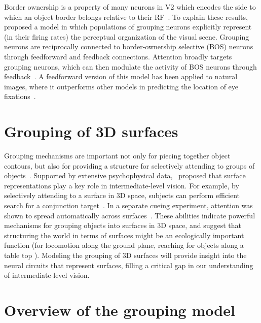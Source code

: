 Border ownership is a property of many neurons in V2 which encodes the side to which an object border belongs relative to their RF~\citep{Zhou_etal00}. To explain these results,~\citet{Craft_etal07} proposed a model in which populations of grouping neurons explicitly represent (in their firing rates) the perceptual organization of the visual scene. Grouping neurons are reciprocally connected to border-ownership selective (BOS) neurons through feedforward and feedback connections. Attention broadly targets grouping neurons, which can then modulate the activity of BOS neurons through feedback~\citep{Mihalas_etal11b}. A feedforward version of this model has been applied to natural images, where it outperforms other models in predicting the location of eye fixations~\citep{Russell_etal14}.

\section{Grouping of 3D surfaces}

Grouping mechanisms are important not only for piecing together object contours, but also for providing a structure for selectively attending
to groups of objects~\citep{Treisman_Gelade80}. Supported by extensive psychophysical data,~\citet*{Nakayama_etal95} proposed that surface
representations play a key role in intermediate-level vision. For example, by selectively attending to a surface in 3D space, subjects can perform efficient search for a conjunction target~\citep{Nakayama_Silverman86}. In a separate cueing experiment, attention was shown to spread automatically across surfaces~\citep{He_Nakayama95}. These abilities indicate powerful mechanisms for grouping objects into surfaces in 3D space, and suggest that structuring the world in terms of surfaces might be an ecologically important function (\eg for locomotion along the ground
plane, reaching for objects along a table top \etc). Modeling the grouping of 3D surfaces will provide insight into the neural circuits that represent surfaces, filling a critical gap in our understanding of intermediate-level vision.

\section{Overview of the grouping model}

